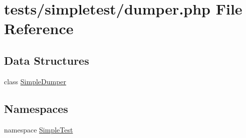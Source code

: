 \hypertarget{dumper_8php}{\section{tests/simpletest/dumper.php File Reference}
\label{dumper_8php}
}
\subsection*{Data Structures}
\begin{DoxyCompactItemize}
\item 
class \hyperlink{class_simple_dumper}{Simple\-Dumper}
\end{DoxyCompactItemize}
\subsection*{Namespaces}
\begin{DoxyCompactItemize}
\item 
namespace \hyperlink{namespace_simple_test}{Simple\-Test}
\end{DoxyCompactItemize}
